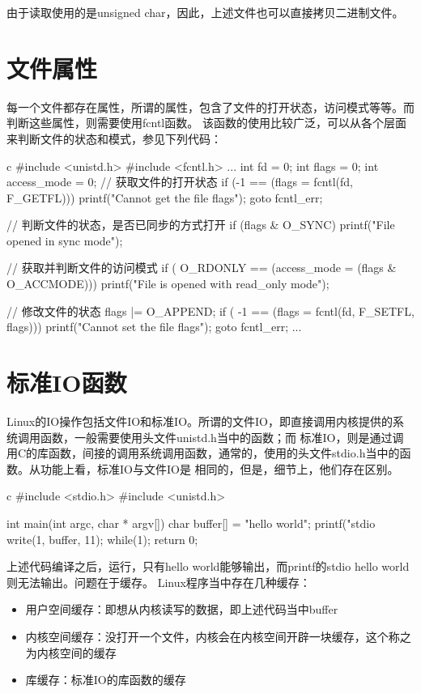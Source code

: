 由于读取使用的是unsigned char，因此，上述文件也可以直接拷贝二进制文件。
\section{文件属性}
每一个文件都存在属性，所谓的属性，包含了文件的打开状态，访问模式等等。而判断这些属性，则需要使用fcntl函数。
该函数的使用比较广泛，可以从各个层面来判断文件的状态和模式，参见下列代码：
\begin{code-block}{c}
#include <unistd.h>
#include <fcntl.h>
...
        int fd = 0;
        int flags = 0;
        int access_mode = 0;
        // 获取文件的打开状态
        if (-1 == (flags = fcntl(fd, F_GETFL))) {
                printf("Cannot get the file flags\n");
                goto fcntl_err;
        }

        // 判断文件的状态，是否已同步的方式打开
        if (flags & O_SYNC) {
                printf("File opened in sync mode\n");
        }

        // 获取并判断文件的访问模式
        if ( O_RDONLY == (access_mode = (flags & O_ACCMODE))) {
                printf("File is opened with read_only mode\n");
        }

        // 修改文件的状态
        flags |= O_APPEND;
        if ( -1 == (flags = fcntl(fd, F_SETFL, flags))) {
                printf("Cannot set the file flags\n");
                goto fcntl_err;
        }
...
\end{code-block}

\section{标准IO函数}
Linux的IO操作包括文件IO和标准IO。所谓的文件IO，即直接调用内核提供的系统调用函数，一般需要使用头文件unistd.h当中的函数；而
标准IO，则是通过调用C的库函数，间接的调用系统调用函数，通常的，使用的头文件stdio.h当中的函数。从功能上看，标准IO与文件IO是
相同的，但是，细节上，他们存在区别。
\begin{code-block}{c}
#include <stdio.h>
#include <unistd.h>

int main(int argc, char * argv[])
{
        char  buffer[] = "hello world";
        printf("stdio %
        write(1, buffer, 11);
        while(1);
        return 0;
}
\end{code-block}

上述代码编译之后，运行，只有hello world能够输出，而printf的stdio hello world则无法输出。问题在于缓存。
Linux程序当中存在几种缓存：
\begin{itemize}
  \item 用户空间缓存：即想从内核读写的数据，即上述代码当中buffer
  \item 内核空间缓存：没打开一个文件，内核会在内核空间开辟一块缓存，这个称之为内核空间的缓存
  \item 库缓存：标准IO的库函数的缓存
\end{itemize}

